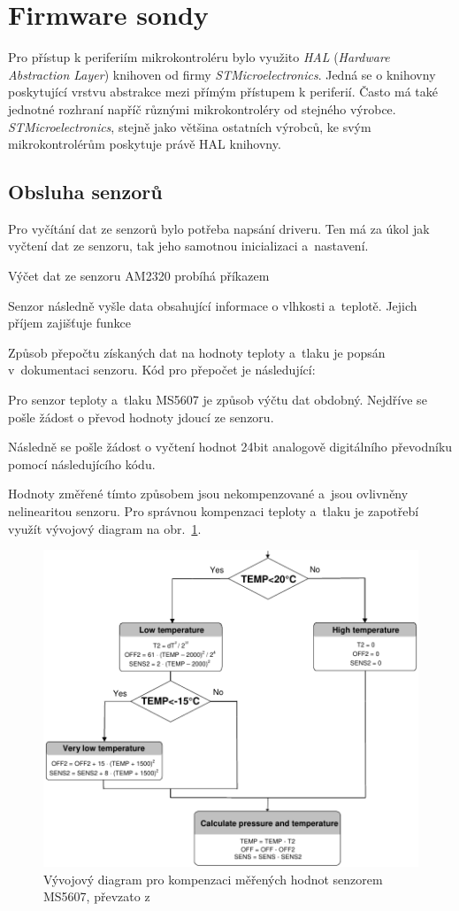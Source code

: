 \documentclass[twoside]{ctuthesis}
\theoremstyle{plain}
\theoremstyle{definition}
\theoremstyle{note}
\begin{document}
	\section{Firmware sondy}
	Pro přístup k periferiím mikrokontroléru bylo využito \textit{HAL} (\textit{Hardware Abstraction Layer}) knihoven od firmy \textit{STMicroelectronics}. Jedná se o knihovny poskytující vrstvu abstrakce mezi přímým přístupem k periferií. Často má také jednotné
	rozhraní napříč různými mikrokontroléry od stejného výrobce. \textit{STMicroelectronics}, stejně jako většina ostatních výrobců, ke svým mikrokontrolérům poskytuje právě HAL knihovny.

		\subsection{Obsluha senzorů}
		Pro vyčítání dat ze senzorů bylo potřeba napsání driveru. Ten má za úkol jak vyčtení dat ze senzoru, tak jeho samotnou inicializaci a~nastavení. 

		Výčet dat ze senzoru AM2320 probíhá příkazem
		

		Senzor následně vyšle data obsahující informace o vlhkosti a~teplotě. Jejich příjem zajišťuje funkce
		

		Způsob přepočtu získaných dat na hodnoty teploty a~tlaku je popsán v~dokumentaci senzoru. Kód pro přepočet je následující:
		

		Pro senzor teploty a~tlaku MS5607 je způsob výčtu dat obdobný. Nejdříve se pošle žádost o převod hodnoty jdoucí ze senzoru.
		
		Následně se pošle žádost o vyčtení hodnot 24bit analogově digitálního převodníku pomocí následujícího kódu.
		

		Hodnoty změřené tímto způsobem jsou nekompenzované a~jsou ovlivněny nelinearitou senzoru. Pro správnou kompenzaci teploty a~tlaku je zapotřebí využít vývojový diagram na obr.~\ref{fig:ms5607:flowchart}.
		\begin{figure}
			\centering
			\includegraphics[width=.7\textwidth]{Figures/MS5607_flowchart.pdf}
			\caption{Vývojový diagram pro kompenzaci měřených hodnot senzorem MS5607, převzato z~\cite{dsh_MS5607}}
			\label{fig:ms5607:flowchart}
		\end{figure}
\end{document}
